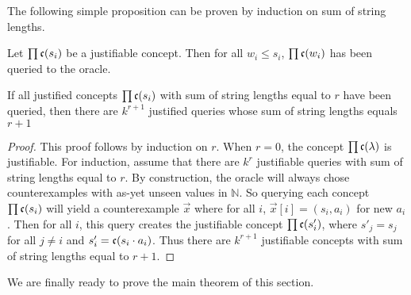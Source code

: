 The following simple proposition can be proven by induction on sum of string lengths.

\begin{proposition}
\label{subjust}
Let $\prod \mathfrak{c}(s_i)$ be a justifiable concept. 
Then for all $w_i \le s_i$, $\prod \mathfrak{c}(w_i)$ has been queried to the oracle.
\end{proposition}

\begin{proposition}
\label{numjustconc}
If all justified concepts $\prod \mathfrak{c}(s_i)$ with sum of string lengths equal to $r$ have been queried, then there are $k^{r+1}$ justified queries whose sum of string lengths equals $r+1$
\end{proposition}
\begin{proof}
This proof follows by induction on $r$. 
When $r=0$, the concept $\prod \mathfrak{c}(\lambda)$ is justifiable.%
For induction, assume that there are $k^r$ justifiable queries with sum of string lengths equal to $r$. 
By construction, the oracle will always chose counterexamples with as-yet unseen values in $\mathbb{N}$. 
So querying each concept $\prod \mathfrak{c}(s_i)$ will yield a counterexample $\vec{x}$ where for all $i$, $\vec{x}[i] = (s_i, a_i)$ for new $a_i$.
Then for all $i$, this query creates the justifiable concept $\prod \mathfrak{c}(s'_i)$, where $s'_j = s_j$ for all $j \ne i$ and $s'_i = \mathfrak{c}(s_i \cdot a_i)$.
Thus there are $k^{r+1}$ justifiable concepts with sum of string lengths equal to $r+1$.
\end{proof}

We are finally ready to prove the main theorem of this section.

